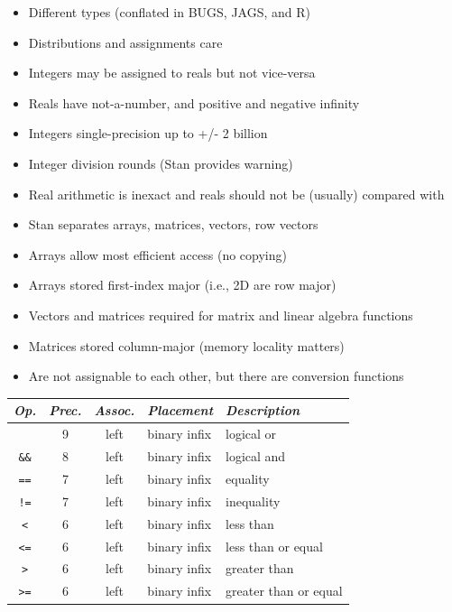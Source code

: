 \documentclass[10pt]{report}
\begin{document}
%
\begin{itemize}
\item Different types (conflated in BUGS, JAGS, and R)
\item Distributions and assignments care
\item Integers may be assigned to reals but not vice-versa
\item Reals have not-a-number, and positive and negative infinity
\item Integers single-precision up to +/- 2 billion
\item Integer division rounds (Stan provides warning)
\item Real arithmetic is inexact and reals should not be (usually) compared with \code{==}
\end{itemize}


%
\begin{itemize}
\item Stan separates arrays, matrices, vectors, row vectors 
\item Arrays allow most efficient access (no copying)
\item Arrays stored first-index major (i.e., 2D are row major)
\item Vectors and matrices required for matrix and linear algebra functions
\item Matrices stored column-major (memory locality matters)
\item Are not assignable to each other, but there are conversion functions
\end{itemize}


%
\vfill
\noindent\spc
{\footnotesize
  \begin{tabular}{c|ccl|l}
    {\it Op.} & {\it Prec.} & {\it Assoc.} & {\it
      Placement} & {\it Description}
    \\ \hline \hline
    \code{||} & 9 & left & binary infix & logical or
    \\ \hline
    \Verb|&&| & 8 & left & binary infix & logical and
    \\ \hline
    \Verb|==| & 7 & left & binary infix & equality
    \\
    \Verb|!=| & 7 & left & binary infix & inequality
    \\ \hline
    \Verb|<| & 6 & left & binary infix & less than
    \\
    \Verb|<=| & 6 & left & binary infix & less than or equal
    \\
    \Verb|>| & 6 & left & binary infix & greater than
    \\
    \Verb|>=| & 6 & left & binary infix & greater than or equal
  \end{tabular}
}
\vfill
\vfill
\end{document}
